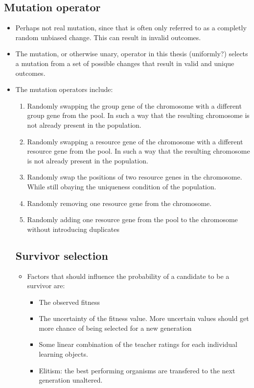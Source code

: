 \subsection{Mutation operator}
\label{sec:approach_mutation_operator}
\begin{itemize}
	\item Perhaps not real mutation, since that is often only referred to as a
		completly random unbiased change. This can result in invalid outcomes.
	\item The mutation, or otherwise unary, operator in this thesis
		(uniformly?) selects a mutation from a set of possible changes that result
		in valid and unique outcomes.
	\item The mutation operators include:
		\begin{enumerate}
			\item Randomly swapping the group gene of the chromosome with a
				different group gene from the pool. In such a way that the
				resulting chromosome is not already present in the population.
			\item Randomly swapping a resource gene of the chromosome with a
				different resource gene from the pool. In such a way that the
				resulting chromosome is not already present in the population.
			\item Randomly swap the positions of two resource genes in the
				chromosome. While still obaying the uniqueness condition of the
				population.
			\item Randomly removing one resource gene from the chromosome.
			\item Randomly adding one resource gene from the pool to the
				chromosome without introducing duplicates
		\end{enumerate}
\subsection{Survivor selection}
\label{sec:approach_survivor_selection}
\begin{itemize}
	\item Factors that should influence the probability of a candidate to be a
		survivor are:
		\begin{itemize}
			\item The observed fitness
			\item The uncertainty of the fitness value. More uncertain values
				should get more chance of being selected for a new generation
			\item Some linear combination of the teacher ratings for each
				individual learning objects.
			\item Elitism: the best performing organisms are transfered to the next generation unaltered.
		\end{itemize}
\end{itemize}

\end{itemize}
